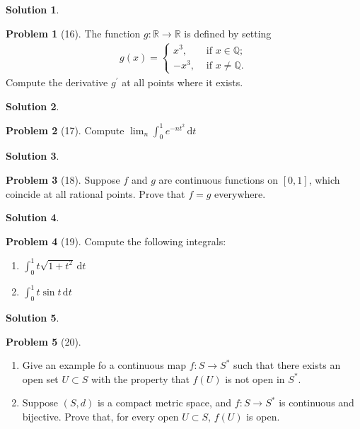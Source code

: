 \documentclass[12pt]{article}
\theoremstyle{definition} %
\newtheorem{solution}{Solution}
\newtheorem{problem}{Problem}
\theoremstyle{plain} %
\begin{document}
\begin{solution}
    
\end{solution}
\begin{problem}[16]
    The function $g: \mathbb{{R}}\to \mathbb{{R}}$ is defined by setting 
    \begin{align}
        g(x) = \begin{cases}
            x^{3}, &\text{ if }  x\in \mathbb{{Q}};\\
            -x^{3}, &\text{ if }  x \neq \mathbb{{Q}}.
        \end{cases}
    \end{align}  
   Compute the derivative $g^\prime $ at all points where it exists.  
\end{problem}
\begin{solution}
    
\end{solution}
\begin{problem}[17]
   Compute $\lim_{n} \int_{0}^{1} e^{-nt^{2}} \,\mathrm{d}t $  
\end{problem}
\begin{solution}
    
\end{solution}
\begin{problem}[18]
   Suppose $f$ and $g$ are continuous functions on $[0,1]$, which coincide at all rational points. Prove that $f=g$ everywhere.  
\end{problem}
\begin{solution}
    
\end{solution}
\begin{problem}[19]
   Compute the following integrals:
   \begin{enumerate}
    \item $\int_{0}^{1} t\sqrt{1+t^{2}}  \,\mathrm{d}t $
    \item $\int_{0}^{1} t \sin t \,\mathrm{d}t $  
   \end{enumerate} 
\end{problem}
\begin{solution}
    
\end{solution}
\begin{problem}[20]
   \begin{enumerate}
    \item Give an example fo a continuous map $f: S\to S^{*}$ such that there exists an open set $U \subset S$ with the property that $f(U)$ is not open in $S^{*}$.
    \item Suppose $(S,d)$ is a compact metric space, and $f:S\to S^{*}$ is continuous and bijective. Prove that, for every open $U \subset S$, $f(U)$ is open.       
   \end{enumerate} 
\end{problem}
\end{document}
